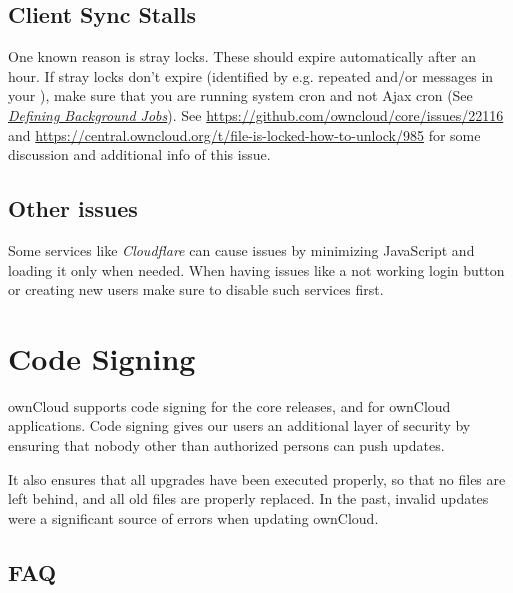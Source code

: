 \documentclass[letterpaper,10pt,english]{sphinxmanual}
\begin{document}
\subsection{Client Sync Stalls}
\label{issues/general_troubleshooting:client-sync-stalls}
One known reason is stray locks. These should expire automatically after an hour. If stray
locks don't expire (identified by e.g. repeated  and/or 
messages in your ), make sure that you are running system cron and
not Ajax cron (See {\hyperref[configuration_server/background_jobs_configuration::doc]{\emph{\emph{Defining Background Jobs}}}}).
See \href{https://github.com/owncloud/core/issues/22116}{https://github.com/owncloud/core/issues/22116} and \href{https://central.owncloud.org/t/file-is-locked-how-to-unlock/985}{https://central.owncloud.org/t/file-is-locked-how-to-unlock/985}
for some discussion and additional info of this issue.


\subsection{Other issues}
\label{issues/general_troubleshooting:other-issues}
Some services like \emph{Cloudflare} can cause issues by minimizing JavaScript
and loading it only when needed. When having issues like a not working
login button or creating new users make sure to disable such services
first.


\section{Code Signing}
\label{issues/code_signing:code-signing}\label{issues/code_signing::doc}\label{issues/code_signing:code-signing-label}
ownCloud supports code signing for the core releases, and for ownCloud
applications. Code signing gives our users an additional layer of security by
ensuring that nobody other than authorized persons can push updates.

It also ensures that all upgrades have been executed properly, so that no files
are left behind, and all old files are properly replaced. In the past, invalid
updates were a significant source of errors when updating ownCloud.


\subsection{FAQ}
\label{issues/code_signing:faq}
\end{document}
